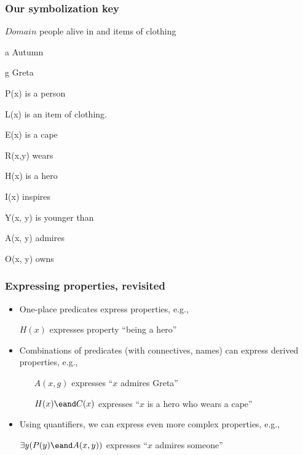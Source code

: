 \begin{frame}
\frametitle{Our symbolization key}

    \begin{ekey}
    \item[$Domain$] people alive in \lecyear{} and items of clothing
    \item[a] Autumn
    \item[g] Greta
    \item[P(x)]  is a person
    \item[L(x)]  is an item of clothing.
    \item[E(x)]  is a cape
    \item[R(x,y)]  wears 
    \item[H(x)]  is a hero
    \item[I(x)]  inspires
    \item[Y(x, y)]  is younger than 
    \item[A(x, y)]  admires 
    \item[O(x, y)]  owns 
    \end{ekey}
\end{frame}


\begin{frame}
  \frametitle{Expressing properties, revisited}
    \begin{itemize}[<+->]
      \item One-place predicates express properties, e.g.,
      \item[] $H(x)$ expresses property ``being a hero''
      \item Combinations of predicates (with connectives, names) can
      express derived properties, e.g.,
      \begin{itemize}[<+->]
        \item[] $A(x, g)$ expresses ``$x$ admires Greta''
        \item[] $H(x) \eand C(x)$ expresses ``$x$ is a hero who wears a cape''
      \end{itemize}
    \item Using quantifiers, we can express even more complex
    properties, e.g.,
    \item[] $\exists y(P(y) \eand A(x, y))$ expresses ``$x$ admires someone''
    \end{itemize}
  \end{frame}
  
